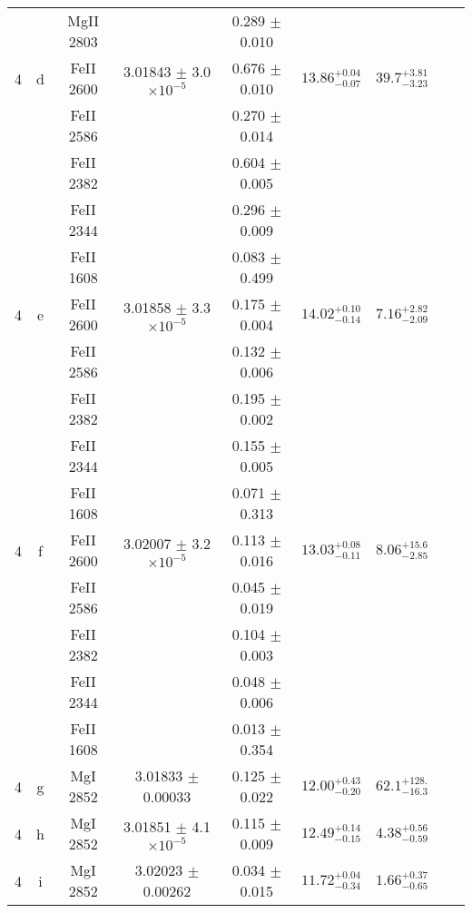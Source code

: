 \documentclass[12pt]{article}
\begin{document}
\begin{footnotesize}
\begin{longtable}{ c c c c c c c c c}
  &   & MgII     2803  &  &  0.289 $\pm$ 0.010   &   &     & 	 & \\ 
       4  & d  & FeII     2600  &  3.01843 $\pm$ 3.0 $\times 10^{-5}$   &  0.676 $\pm$ 0.010   & $13.86_{ - 0.07}^{ + 0.04}$  & $39.7_{ - 3.23}^{ + 3.81}$    & 	 & \\ 
  &   & FeII     2586  &  &  0.270 $\pm$ 0.014   &   &     & 	 & \\ 
  &   & FeII     2382  &  &  0.604 $\pm$ 0.005   &   &     & 	 & \\ 
  &   & FeII     2344  &  &  0.296 $\pm$ 0.009   &   &     & 	 & \\ 
  &   & FeII     1608  &  &  0.083 $\pm$ 0.499   &   &     & 	 & \\ 
       4  & e  & FeII     2600  &  3.01858 $\pm$ 3.3 $\times 10^{-5}$   &  0.175 $\pm$ 0.004   & $14.02_{ - 0.14}^{ + 0.10}$  & $7.16_{ - 2.09}^{ + 2.82}$    & 	 & \\ 
  &   & FeII     2586  &  &  0.132 $\pm$ 0.006   &   &     & 	 & \\ 
  &   & FeII     2382  &  &  0.195 $\pm$ 0.002   &   &     & 	 & \\ 
  &   & FeII     2344  &  &  0.155 $\pm$ 0.005   &   &     & 	 & \\ 
  &   & FeII     1608  &  &  0.071 $\pm$ 0.313   &   &     & 	 & \\ 
       4  & f  & FeII     2600  &  3.02007 $\pm$ 3.2 $\times 10^{-5}$   &  0.113 $\pm$ 0.016   & $13.03_{ - 0.11}^{ + 0.08}$  & $8.06_{ - 2.85}^{ + 15.6}$    & 	 & \\ 
  &   & FeII     2586  &  &  0.045 $\pm$ 0.019   &   &     & 	 & \\ 
  &   & FeII     2382  &  &  0.104 $\pm$ 0.003   &   &     & 	 & \\ 
  &   & FeII     2344  &  &  0.048 $\pm$ 0.006   &   &     & 	 & \\ 
  &   & FeII     1608  &  &  0.013 $\pm$ 0.354   &   &     & 	 & \\ 
       4  & g  & MgI     2852  &  3.01833 $\pm$ 0.00033  &  0.125 $\pm$ 0.022   & $12.00_{ - 0.20}^{ + 0.43}$  & $62.1_{ - 16.3}^{ + 128.}$    & 	 & \\ 
       4  & h  & MgI     2852  &  3.01851 $\pm$ 4.1 $\times 10^{-5}$   &  0.115 $\pm$ 0.009   & $12.49_{ - 0.15}^{ + 0.14}$  & $4.38_{ - 0.59}^{ + 0.56}$    & 	 & \\ 
       4  & i  & MgI     2852  &  3.02023 $\pm$ 0.00262  &  0.034 $\pm$ 0.015   & $11.72_{ - 0.34}^{ + 0.04}$  & $1.66_{ - 0.65}^{ + 0.37}$    & 	 & \\ 

\end{longtable}
\end{footnotesize}
\end{document}
